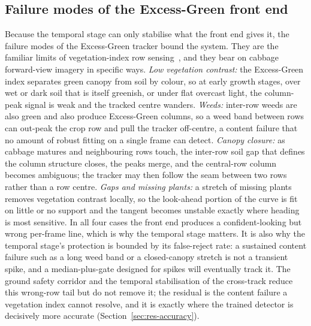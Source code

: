 \subsection{Failure modes of the Excess-Green front end}
\label{sec:disc-exg}
Because the temporal stage can only stabilise what the front end gives it, the
failure modes of the Excess-Green tracker bound the system. They are the familiar
limits of vegetation-index row
sensing~\cite{woebbecke1995,meyer2008,marchant1995}, and they bear on cabbage
forward-view imagery in specific ways.
\emph{Low vegetation contrast:} the Excess-Green index separates green canopy
from soil by colour, so at early growth stages, over wet or dark soil that is
itself greenish, or under flat overcast light, the column-peak signal is weak and
the tracked centre wanders.
\emph{Weeds:} inter-row weeds are also green and also produce Excess-Green
columns, so a weed band between rows can out-peak the crop row and pull the
tracker off-centre, a content failure that no amount of robust fitting on a
single frame can detect.
\emph{Canopy closure:} as cabbage matures and neighbouring rows touch, the
inter-row soil gap that defines the column structure closes, the peaks merge, and
the central-row column becomes ambiguous; the tracker may then follow the seam
between two rows rather than a row centre.
\emph{Gaps and missing plants:} a stretch of missing plants removes vegetation
contrast locally, so the look-ahead portion of the curve is fit on little or no
support and the tangent becomes unstable exactly where heading is most sensitive.
In all four cases the front end produces a confident-looking but wrong per-frame
line, which is why the temporal stage matters. It is also why the temporal
stage's protection is bounded by its false-reject rate: a sustained content
failure such as a long weed band or a closed-canopy stretch is not a transient
spike, and a median-plus-gate designed for spikes will eventually track it. The ground safety corridor and
the temporal stabilisation of the cross-track reduce this wrong-row tail but do not remove it; the residual
is the content failure a vegetation index cannot resolve, and it is exactly where the trained detector is
decisively more accurate (Section~\ref{sec:res-accuracy}).

